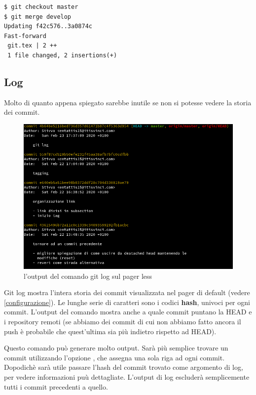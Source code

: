 \documentclass{article} \usepackage[textwidth=19cm,textheight=24cm]{geometry}
\begin{document}
\begin{verbatim}
$ git checkout master
$ git merge develop
Updating f42c576..3a0874c
Fast-forward
 git.tex | 2 ++
 1 file changed, 2 insertions(+)
\end{verbatim}

\subsection{Log\label{log}}

Molto di quanto appena spiegato sarebbe inutile se non si potesse vedere la
storia dei commit.

\begin{figure}
\includegraphics[width=6in]{logOutput.png}
\centering
\caption{l'output del comando git log sul pager less}
\end{figure}

Git log mostra l'intera storia dei commit visualizzata nel pager di default
(vedere \ref{configurazione}).
Le lunghe serie di caratteri sono i codici \textbf{hash}, univoci per ogni
commit. L'output del comando mostra anche a quale commit puntano la HEAD e i
repository remoti (se abbiamo dei commit di cui non abbiamo fatto ancora il push
è probabile che quest'ultima sia più indietro rispetto ad HEAD).

Questo comando può generare molto output. Sarà più semplice trovare un commit
utilizzando l'opzione , che assegna una sola
riga ad ogni commit. Dopodichè sarà utile passare l'hash del commit trovato come
argomento di log, per vedere informazioni puù dettagliate. L'output di log
escluderà semplicemente tutti i commit precedenti a quello.
\end{document}
